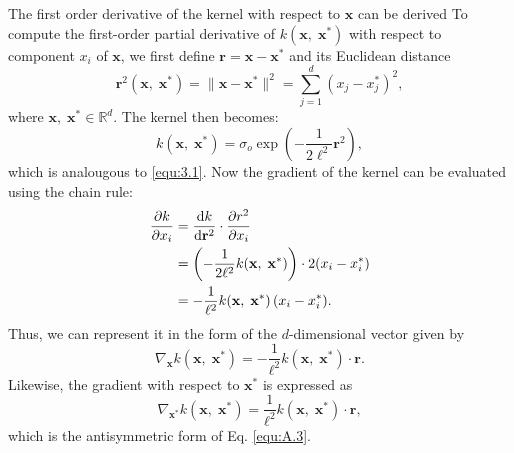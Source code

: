 The first order derivative of the kernel with respect to $\mathbf{x}$ can be derived
To compute the first-order partial derivative of $k(\mathbf{x},\;\mathbf{x}^*)$ with respect to component $x_i$ of $\mathbf{x}$, we first define $\mathbf{r}=\mathbf{x} - \mathbf{x}^{*}$ and its Euclidean distance
\[
\mathbf{r}^2(\mathbf{x},\;\mathbf{x}^{*}) = \|\mathbf{x} - \mathbf{x}^{*}\|^2 = \sum_{j=1}^d (x_j - x_j^*)^2,
\]
where $\mathbf{x},\;\mathbf{x}^{*}\in\mathbb{R}^{d}$. The kernel then becomes:
\[
k(\mathbf{x},\;\mathbf{x}^*) = \sigma_{o} \exp\left( -\frac{1}{2\ell^2} \mathbf{r}^2 \right),
\]
which is analougous to \eqref{equ:3.1}.
Now the gradient of the kernel can be evaluated using the chain rule:
\begin{align}
\frac{\partial k}{\partial x_i} 
&= \frac{\mathrm{d}k}{\mathrm{d}\mathbf{r}^2} \cdot \frac{\partial r^2}{\partial x_i} \notag \\
&= \left( -\frac{1}{2\ell^2} k(\mathbf{x},\;\mathbf{x}^*) \right) \cdot 2(x_i - x_i^*) \notag \\
&= -\frac{1}{\ell^2} k(\mathbf{x},\;\mathbf{x}^*)\,(x_i - x_i^*).\label{equ:A.2}
\end{align}
Thus, we can represent it in the form of the $d$-dimensional vector given by
\begin{equation} \label{equ:A.3}
\boxed{
    \nabla_{\mathbf{x}} k(\mathbf{x},\;\mathbf{x}^*) =
    -\frac{1}{\ell^2} k(\mathbf{x},\;\mathbf{x}^*)
    \cdot\mathbf{r}.
    }
\end{equation}
Likewise, the gradient with respect to $\mathbf{x}^{*}$ is expressed as
\begin{equation} \label{equ:A.4}
\boxed{
    \nabla_{\mathbf{x}^{*}} k(\mathbf{x},\;\mathbf{x}^*) = 
    \frac{1}{\ell^2} k(\mathbf{x},\;\mathbf{x}^*)
    \cdot\mathbf{r},
    }
\end{equation}
which is the antisymmetric form of Eq. \eqref{equ:A.3}.

